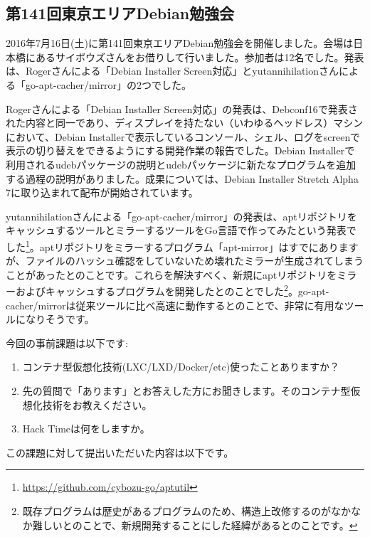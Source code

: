 \documentclass[mingoth,a4paper]{jsarticle}
\begin{document}

\subsection{第141回東京エリアDebian勉強会}

2016年7月16日(土)に第141回東京エリアDebian勉強会を開催しました。会場は日本橋にあるサイボウズさんをお借りして行いました。参加者は12名でした。発表は、Rogerさんによる「Debian Installer Screen対応」とyutannihilationさんによる「go-apt-cacher/mirror」の2つでした。


Rogerさんによる「Debian Installer Screen対応」の発表は、Debconf16で発表された内容と同一であり、ディスプレイを持たない（いわゆるヘッドレス）マシンにおいて、Debian Installerで表示しているコンソール、シェル、ログをscreenで表示の切り替えをできるようにする開発作業の報告でした。Debian Installerで利用されるudebパッケージの説明とudebパッケージに新たなプログラムを追加する過程の説明がありました。成果については、Debian Installer Stretch Alpha 7に取り込まれて配布が開始されています。


yutannihilationさんによる「go-apt-cacher/mirror」の発表は、aptリポジトリをキャッシュするツールとミラーするツールをGo言語で作ってみたという発表でした\footnote{\url{https://github.com/cybozu-go/aptutil}}。aptリポジトリをミラーするプログラム「apt-mirror」はすでにありますが、ファイルのハッシュ確認をしていないため壊れたミラーが生成されてしまうことがあったとのことです。これらを解決すべく、新規にaptリポジトリをミラーおよびキャッシュするプログラムを開発したとのことでした\footnote{既存プログラムは歴史があるプログラムのため、構造上改修するのがなかなか難しいとのことで、新規開発することにした経緯があるとのことです。}。go-apt-cacher/mirrorは従来ツールに比べ高速に動作するとのことで、非常に有用なツールになりそうです。



今回の事前課題は以下です:
\begin{enumerate}
  \item コンテナ型仮想化技術(LXC/LXD/Docker/etc)使ったことありますか？
  \item 先の質問で「あります」とお答えした方にお聞きします。そのコンテナ型仮想化技術をお教えください。
  \item Hack Timeは何をしますか。
\end{enumerate}
この課題に対して提出いただいた内容は以下です。
\begin{multicols}{2}
{\small

}
\end{multicols}
\end{document}

